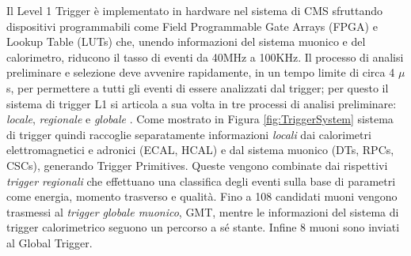 Il Level 1 Trigger è implementato in hardware nel sistema di CMS sfruttando dispositivi programmabili come Field Programmable Gate Arrays (FPGA) e Lookup Table (LUTs) che, unendo informazioni del sistema muonico e del calorimetro, riducono il tasso di eventi da 40MHz a 100KHz. Il processo di analisi preliminare e selezione deve avvenire rapidamente, in un tempo limite di circa 4 $\mu$s, per permettere a tutti gli eventi di essere analizzati dal trigger; per questo il sistema di trigger L1 si articola a sua volta in tre processi di analisi preliminare: \textit{locale}, \textit{regionale} e \textit{globale} \cite{MasterThesisNicLai}.\newline
Come mostrato in Figura \ref{fig:TriggerSystem} sistema di trigger quindi raccoglie separatamente informazioni \textit{locali} dai calorimetri elettromagnetici e adronici (ECAL, HCAL) e dal sistema muonico (DTs, RPCs, CSCs), generando Trigger Primitives. Queste vengono combinate dai rispettivi \textit{trigger regionali} che effettuano una classifica degli eventi sulla base di parametri come energia, momento trasverso e qualità. Fino a 108 candidati muoni vengono trasmessi al \textit{trigger globale muonico}, GMT, mentre le informazioni del sistema di trigger calorimetrico seguono un percorso a sé stante. Infine 8 muoni sono inviati al Global Trigger.


